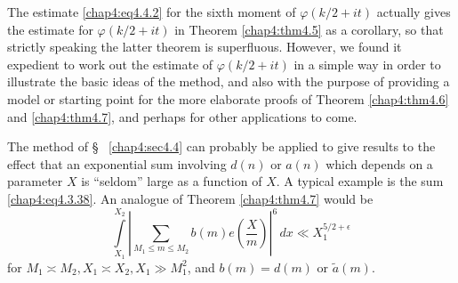 The estimate \eqref{chap4:eq4.4.2} for the sixth moment of $\varphi(k
/2+it)$ actually gives the estimate for $\varphi(k /2+it)$ in Theorem
\ref{chap4:thm4.5} as a corollary, so that strictly speaking the
latter theorem is superfluous. However, we found it expedient to work
out the estimate of $\varphi(k /2+it)$ in a simple way in order to
illustrate the basic ideas of the method, and also with the purpose of
providing a model or starting point for the more elaborate proofs of
Theorem \ref{chap4:thm4.6} and \ref{chap4:thm4.7}, and perhaps for
other applications to come. 

The method of \S~ \ref{chap4:sec4.4} can probably be applied to give
results to the effect that an exponential sum involving $d(n)$ or
$a(n)$ which depends on a parameter $X$ is ``seldom'' large as a
function of $X$. A typical example is the sum
\eqref{chap4:eq4.3.38}. An analogue of Theorem \ref{chap4:thm4.7}
would be  
$$
\int\limits_{X_1}^{X_2}\left|\sum\limits_{M_1\leq m\leq
  M_2}b(m)e\left( \frac{X}{m}\right)\right|^6\,dx \ll
X_1^{5/2+\epsilon} 
$$ 
for $M_1\asymp M_2, X_1\asymp X_2, X_1\gg M_1^2$, and $b(m)=d(m)$ or
$\tilde{a}(m)$.  


\bigskip



